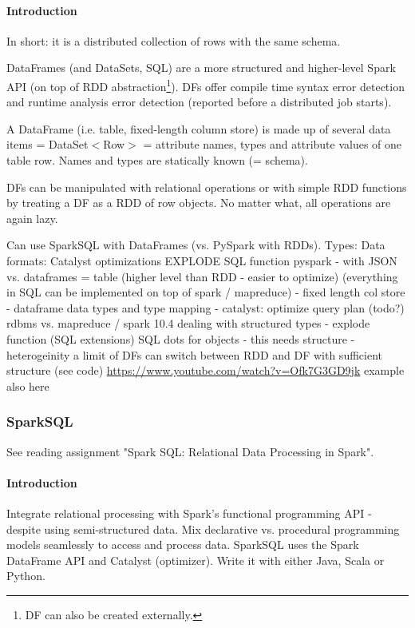 \paragraph{Introduction}
In short: it is a distributed collection of rows with the same schema.

DataFrames (and DataSets, SQL) are a more structured and higher-level Spark API (on top of RDD abstraction\footnote{DF can also be created externally.}). DFs offer compile time syntax error detection and runtime analysis error detection (reported before a distributed job starts).

A DataFrame (i.e. table, fixed-length column store) is made up of several data items = DataSet$<$Row$>$ = attribute names, types and attribute values of one table row. Names and types are statically known (= schema).

DFs can be manipulated with relational operations or with simple RDD functions by treating a DF as a RDD of row objects. No matter what, all operations are again lazy.














Can use SparkSQL with DataFrames (vs. PySpark with RDDs).
Types: %
Data formats: %
Catalyst optimizations
EXPLODE SQL function
pyspark - with JSON vs. dataframes = table (higher level than RDD - easier to optimize) (everything in SQL can be implemented on top of spark / mapreduce)
- fixed length col store
- dataframe data types and type mapping
- catalyst: optimize query plan (todo?)
rdbms vs. mapreduce / spark 10.4
dealing with structured types - explode function (SQL extensions) SQL dots for objects - this needs structure - heterogeinity a limit of DFs
can switch between RDD and DF with sufficient structure (see code) \url{https://www.youtube.com/watch?v=Ofk7G3GD9jk} example also here



\subsubsection{SparkSQL}

See reading assignment "Spark SQL: Relational Data Processing in Spark".

\paragraph{Introduction}
Integrate relational processing with Spark's functional programming API - despite using semi-structured data. Mix declarative vs. procedural programming models seamlessly to access and process data. SparkSQL uses the Spark DataFrame API and Catalyst (optimizer). Write it with either Java, Scala or Python.

